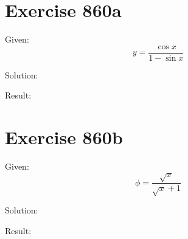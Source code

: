 \documentclass[a4paper, 10pt]{scrartcl}
\begin{document}
\section{Exercise 860a}

Given:
\[
y = \frac{\cos{x}}{1 - \sin{x}}
\]

Solution:

Result:

\section{Exercise 860b}

Given:
\[
\phi = \frac{\sqrt{x}}{\sqrt{x} + 1}
\]

Solution:

Result:
\end{document}
